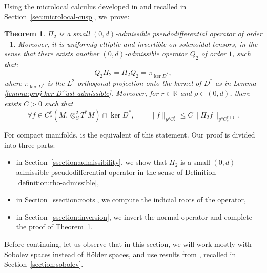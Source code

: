 \documentclass[JEP,XML,SOM,Unicode,NoFloatCountersInSection]{cedram}
\newcommand{\R}{\mathbb{R}}
\theoremstyle{plain}
\newtheorem{theorem}{Theorem}[section]
\theoremstyle{definition}
\begin{document}
Using the microlocal calculus developed in \cite{Bonthonneau-Lefeuvre-19-1} and recalled in Section~\ref{sec:microlocal-cusp}, we~prove:

\begin{theorem}
\label{theorem:main-technical}
$\Pi_2$ is a small $(0,d)$-admissible pseudodifferential operator of order $-1$. Moreover, it is uniformly elliptic and invertible on solenoidal tensors, in the sense that there exists another $(0,d)$-admissible operator $Q_2$ of order $1$, such that:
\[
Q_2\Pi_2 = \Pi_2 Q_2 =\pi_{\ker D^\ast},
\]
where $\pi_{\ker D^\ast}$ is the $L^2$-orthogonal projection onto the kernel of $D^\ast$ as in Lemma \ref{lemma:proj-ker-D^ast-admissible}. Moreover, for $r\in\R$ and $\rho\in (0,d)$, there exists $C > 0$ such that
\begin{equation}
\label{equation:pi2-estimate}
\forall f \in C^r_*(M,\otimes^2_S T^*M) \cap \ker D^*, \qquad \|f\|_{y^\rho C^r_*} \leq C \|\Pi_2f\|_{y^\rho C^{r+1}_*}.
\end{equation}
\end{theorem}

For compact manifolds, \cite[Lem.\,4.9]{Gouezel-Lefeuvre-19} is the equivalent of this statement. Our proof is divided into three parts:
\begin{itemize}
\item in Section~\ref{ssection:admissibility}, we show that $\Pi_2$ is a small $(0,d)$-admissible pseudodifferential operator in the sense of Definition \ref{definition:rho-admissible},
\item in Section~\ref{ssection:roots}, we compute the indicial roots of the operator,
\item in Section~\ref{ssection:inversion}, we invert the normal operator and complete the proof of Theorem~\ref{theorem:main-technical}.
\end{itemize}

Before continuing, let us observe that in this section, we will work mostly with Sobolev spaces instead of Hölder spaces, and use results from \cite{Bonthonneau-Weich-17}, recalled in Section~\ref{section:sobolev}.
\end{document}
